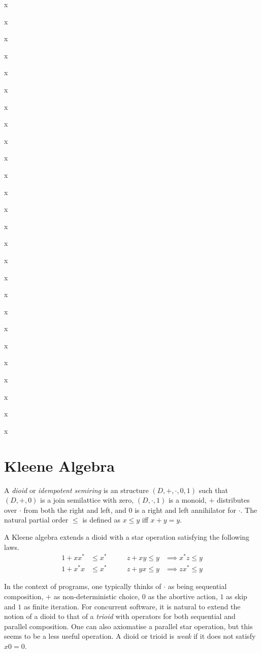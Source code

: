 \documentclass{llncs}
\begin{document}
x

x

x

x

x

x

x

x

x

x

x

x

x

x

x

x

x

x

x

x

x

x

x

x

x

x

\newpage
\section{Kleene Algebra}
\label{sec:KA}

A \emph{dioid} or \emph{idempotent semiring} is an structure
$(D,+,\cdot,0,1)$ such that $(D,+,0)$ is a join semilattice with zero,
$(D,\cdot,1)$ is a monoid, $+$ distributes over $\cdot$ from both the
right and left, and $0$ is a right and left annihilator for
$\cdot$. The natural partial order $\le$ is defined as $x \le y $ iff
$x + y = y$.

A Kleene algebra extends a dioid with a star operation satisfying the
following laws.
\begin{align*}
  1 + xx^* &\le x^* &\qquad z + xy \le y &\implies x^*z \le y\\
  1 + x^*x &\le x^* &\qquad z + yx \le y &\implies zx^* \le y
\end{align*}

In the context of programs, one typically thinks of $\cdot$ as being
sequential composition, $+$ as non-deterministic choice, $0$ as the
abortive action, $1$ as skip and $1$ as finite iteration. For
concurrent software, it is natural to extend the notion of a dioid to
that of a \emph{trioid} with operators for both sequential and
parallel composition. One can also axiomatise a parallel star
operation, but this seems to be a less useful operation. A
dioid or trioid is \emph{weak} if it does not satisfy $x0 = 0$.
\end{document}
